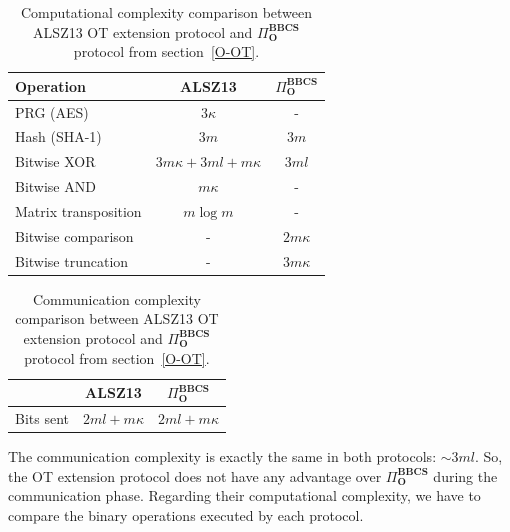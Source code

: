 \begin{table}[h!]
\centering
\begin{tabular}{lcc}
\toprule
Operation & ALSZ13 & $\Pi^{\textbf{BBCS}}_{\textbf{O}}$ \\
\midrule
PRG (AES)     & $3\kappa$              & -\\ 
Hash (SHA-1)    & $3m$              & $3m$ \\ 
Bitwise XOR      & $3 m \kappa + 3ml + m\kappa$             & $3ml$  \\ 
Bitwise AND  & $m\kappa$              & -           \\
Matrix transposition & $m\log m$              & -           \\
Bitwise comparison & -             & $2m\kappa$           \\
Bitwise truncation & -            & $3m\kappa$           \\
\bottomrule
\end{tabular}
\caption{Computational complexity comparison between ALSZ13 \cite{ALSZ13} OT extension protocol and $\Pi^{\textbf{BBCS}}_{\textbf{O}}$ protocol from section~\ref{O-OT}.}
\label{table:CvsQ_OT_comparison_computation}
\end{table}

\begin{table}[h!]
\centering
\begin{tabular}{lcc}
\toprule
 & ALSZ13 & $\Pi^{\textbf{BBCS}}_{\textbf{O}}$  \\
\midrule
\multicolumn{1}{l}{Bits sent }   & $2ml  + m\kappa$   & $2ml + m\kappa $  \\
\bottomrule
\end{tabular}
\caption{Communication complexity comparison between ALSZ13 \cite{ALSZ13} OT extension protocol and $\Pi^{\textbf{BBCS}}_{\textbf{O}}$ protocol from section~\ref{O-OT}.}
\label{table:CvsQ_OT_comparison_communication}
\end{table}

The communication complexity is exactly the same in both protocols: $\sim 3ml$. So, the OT extension protocol does not have any advantage over $\Pi^{\textbf{BBCS}}_{\textbf{O}}$ during the communication phase. Regarding their computational complexity, we have to compare the binary operations executed by each protocol.

